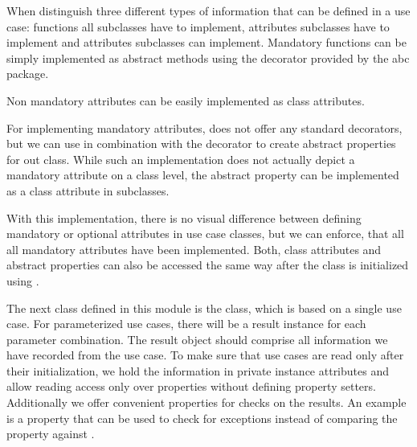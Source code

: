 

When distinguish three different types of information that can be
defined in a use case: functions all subclasses have to implement, attributes
subclasses have to implement and attributes subclasses can implement.
Mandatory functions can be simply implemented as abstract methods using the
 decorator provided by the abc package.



Non mandatory attributes can be easily implemented as class attributes.



For implementing mandatory attributes,  does not offer
any standard decorators, but we can use  in
combination with the  decorator to create
abstract properties for out class. While such an implementation does not
actually depict a mandatory attribute on a class level, the abstract property
can be implemented as a class attribute in subclasses.





With this implementation, there is no visual difference between defining
mandatory or optional attributes in use case classes, but we can enforce, that
all all mandatory attributes have been implemented. Both, class attributes and
abstract properties can also be accessed the same way after the class is
initialized using .

The next class defined in this module is the 
class, which is based on a single use case. For parameterized use cases, there
will be a result instance for each parameter combination. The result object
should comprise all information we have recorded from the use case. To make sure
that use cases are read only after their initialization, we hold the information
in private instance attributes and allow reading access only over properties
without defining property setters. Additionally we offer convenient properties
for checks on the results. An example is a  property
that can be used to check for exceptions instead of comparing the
 property against
.

